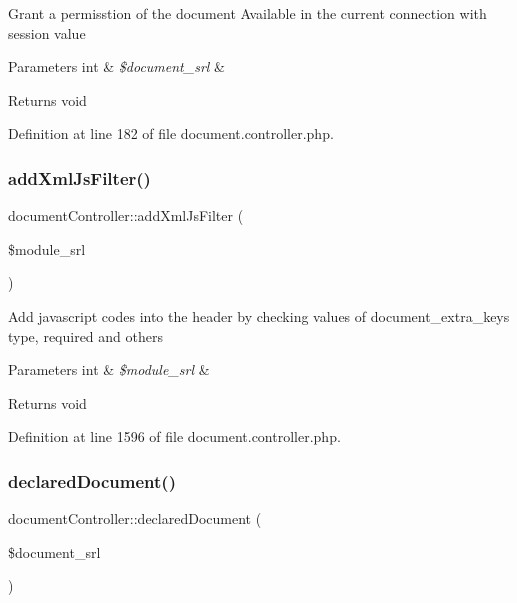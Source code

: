 Grant a permisstion of the document Available in the current connection with session value 
\begin{DoxyParams}[1]{Parameters}
int & {\em \$document\+\_\+srl} & \\
\hline
\end{DoxyParams}
\begin{DoxyReturn}{Returns}
void 
\end{DoxyReturn}


Definition at line 182 of file document.\+controller.\+php.

\mbox{\label{classdocumentController_a1fe6155cfd253e19d0583cc74a2cab35}} 
\subsubsection{\texorpdfstring{add\+Xml\+Js\+Filter()}{addXmlJsFilter()}}
{\footnotesize\ttfamily document\+Controller\+::add\+Xml\+Js\+Filter (\begin{DoxyParamCaption}\item[{}]{\$module\+\_\+srl }\end{DoxyParamCaption})}

Add javascript codes into the header by checking values of document\+\_\+extra\+\_\+keys type, required and others 
\begin{DoxyParams}[1]{Parameters}
int & {\em \$module\+\_\+srl} & \\
\hline
\end{DoxyParams}
\begin{DoxyReturn}{Returns}
void 
\end{DoxyReturn}


Definition at line 1596 of file document.\+controller.\+php.

\mbox{\label{classdocumentController_aa2cdd129c5f882d535e39728761d4168}} 
\subsubsection{\texorpdfstring{declared\+Document()}{declaredDocument()}}
{\footnotesize\ttfamily document\+Controller\+::declared\+Document (\begin{DoxyParamCaption}\item[{}]{\$document\+\_\+srl }\end{DoxyParamCaption})}

